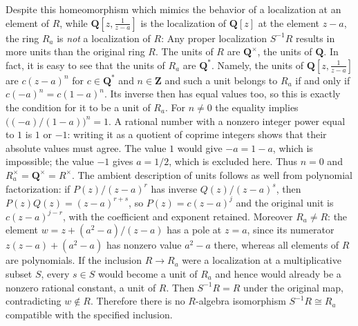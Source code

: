 \begin{example}
\medskip\noindent
Despite this homeomorphism which mimics the behavior of a
localization at an element of $R$, while
$\mathbf{Q}[z, \frac{1}{z-a}]$ is the localization of $\mathbf{Q}[z]$
at the element $z-a$, the ring $R_a$ is {\it not} a
localization of $R$: Any proper localization $S^{-1}R$ results in more
units than the original ring $R$.  The units of $R$ are
$\mathbf{Q}^\times$, the units of $\mathbf{Q}$.  In fact, it is
easy to see that the units of $R_a$ are $\mathbf{Q}^*$.
Namely, the units of $\mathbf{Q}[z, \frac{1}{z - a}]$ are
$c (z - a)^n$ for $c \in \mathbf{Q}^*$ and $n \in \mathbf{Z}$
and such a unit belongs to $R_a$ if and only if
$c(-a)^n=c(1-a)^n$. Its inverse then has equal values too, so
this is exactly the condition for it to be a unit of $R_a$.
For $n\ne0$ the equality implies
$\bigl((-a)/(1-a)\bigr)^n=1$.
A rational number with a nonzero integer power equal to $1$ is $1$ or $-1$:
writing it as a quotient of coprime integers shows that their absolute
values must agree. The value $1$ would give $-a=1-a$, which is impossible;
the value $-1$ gives $a=1/2$, which is excluded here.
Thus $n=0$ and $R_a^\times=\mathbf Q^\times=R^\times$.
The ambient description of units follows as well from polynomial
factorization: if $P(z)/(z-a)^r$ has inverse $Q(z)/(z-a)^s$, then
$P(z)Q(z)=(z-a)^{r+s}$, so $P(z)=c(z-a)^j$ and the original unit
is $c(z-a)^{j-r}$, with the coefficient and exponent retained.
Moreover $R_a\ne R$: the element
$w=z+(a^2-a)/(z-a)$ has a pole at $z=a$, since its numerator
$z(z-a)+(a^2-a)$ has nonzero value $a^2-a$ there, whereas all
elements of $R$ are polynomials.
If the inclusion $R\to R_a$ were a localization at a multiplicative
subset $S$, every $s\in S$ would become a unit of $R_a$ and hence
would already be a nonzero rational constant, a unit of $R$.
Then $S^{-1}R=R$ under the original map, contradicting $w\notin R$.
Therefore there is no $R$-algebra isomorphism $S^{-1}R\cong R_a$
compatible with the specified inclusion.


\end{example}
